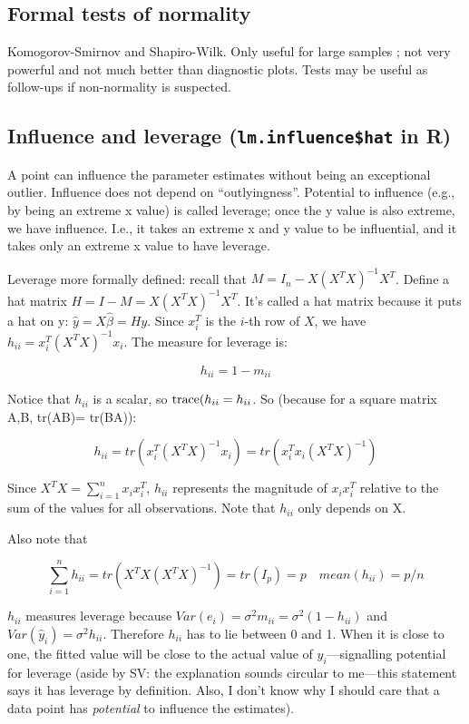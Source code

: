 \subsection{Formal tests of normality}

Komogorov-Smirnov and Shapiro-Wilk. Only useful for large samples ; not very powerful and not much better than diagnostic plots. Tests may be useful as follow-ups if non-normality is suspected.

\subsection{Influence and leverage (\texttt{lm.influence\$hat} in R)}

A point can influence the parameter estimates without being an exceptional outlier. Influence does not depend on ``outlyingness''. Potential to influence (e.g., by being an extreme x value) is called leverage; once the y value is also extreme, we have influence. I.e., it takes an extreme x and y value to be influential, and it takes only an extreme x value to have leverage.

Leverage more formally defined: recall that $M = I_n -  X (X^T X)^{-1} X^T$. Define a hat matrix $H=I-M=X (X^T X)^{-1} X^T$. It's called a hat matrix because it puts a hat on y: $\hat{y} = X \hat{\beta} = Hy$.
Since $x_i^T$  is the $i$-th row of $X$, we have $h_{ii} = x_i^T (X^T X)^{-1}x_i$. The measure for leverage is:

\begin{equation}
h_{ii} = 1 - m_{ii}
\end{equation}

Notice that $h_{ii}$ is a scalar, so $\hbox{trace}(h_{ii}=h_{ii}$.
So (because for a square matrix A,B, tr(AB)= tr(BA)):

\begin{equation}
h_{ii} = tr(x_i^T (X^T X)^{-1}x_i)=tr(x_i^T x_i (X^T X)^{-1})
\end{equation}

Since $X^T X = \sum_{i=1}^n x_i x_i^T$, $h_{ii}$ represents the magnitude of $ x_i x_i^T$ relative to the sum of the values for all observations. Note that $h_{ii}$ only depends on X. 

Also note that

\begin{equation}
\sum_{i=1}^n h_{ii} = tr(X^T X (X^T X)^{-1}) = tr(I_p)=p \quad mean(h_{ii})=p/n
\end{equation}

$h_{ii}$ measures leverage because $Var(e_i)=\sigma^2 m_{ii} = \sigma^2(1-h_{ii})$ and $Var(\hat{y}_i) = \sigma^2 h_{ii}$. Therefore $h_{ii}$ has to lie between 0 and 1. When it is close to one, the fitted value will be close to the actual value of $y_i$---signalling potential for leverage (aside by SV: the explanation sounds circular to me---this statement says it has leverage by definition. Also, I don't know why I should care that a data point has \textit{potential} to influence the estimates).  

